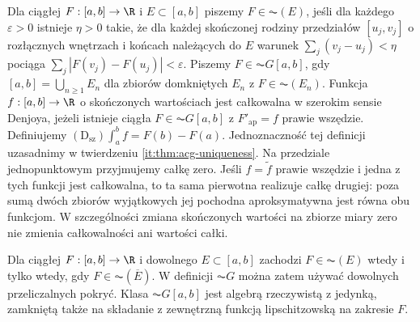 \begin{definicja}\label{it:def:denjoy-broad}
Dla ciągłej $F:[a,b]\to\R$ i $E\subset[a,b]$ piszemy $F\in\AC(E)$, jeśli dla każdego $\varepsilon>0$ istnieje $\eta>0$ takie, że dla każdej skończonej rodziny przedziałów $[u_j,v_j]$ o rozłącznych wnętrzach i końcach należących do $E$ warunek $\sum_j(v_j-u_j)<\eta$ pociąga $\sum_j|F(v_j)-F(u_j)|<\varepsilon$. Piszemy $F\in\AC G[a,b]$, gdy $[a,b]=\bigcup_{n\ge1}E_n$ dla zbiorów domkniętych $E_n$ z $F\in\AC(E_n)$. Funkcja $f:[a,b]\to\R$ o skończonych wartościach jest całkowalna w szerokim sensie Denjoya, jeżeli istnieje ciągła $F\in\AC G[a,b]$ z $F'_{\mathrm{ap}}=f$ prawie wszędzie. Definiujemy $(\mathrm D_{\mathrm{sz}})\int_a^b f=F(b)-F(a)$. Jednoznaczność tej definicji uzasadnimy w twierdzeniu \ref{it:thm:acg-uniqueness}. Na przedziale jednopunktowym przyjmujemy całkę zero.
Jeśli $f=\widetilde f$ prawie wszędzie i jedna z tych
funkcji jest całkowalna, to ta sama pierwotna realizuje
całkę drugiej: poza sumą dwóch zbiorów wyjątkowych jej
pochodna aproksymatywna jest równa obu funkcjom.
W szczególności zmiana skończonych wartości na zbiorze
miary zero nie zmienia całkowalności ani wartości całki.
\end{definicja}
\begin{twierdzenie}
\label{it:thm:acg-closure-algebra}\label{ma1:kh:thm:acg-algebra}
Dla ciągłej $F:[a,b]\to\R$ i dowolnego $E\subset[a,b]$
zachodzi $F\in\AC(E)$ wtedy i tylko wtedy, gdy $F\in\AC(\overline E)$.
W definicji $\AC G$ można zatem używać dowolnych przeliczalnych
pokryć. Klasa $\AC G[a,b]$ jest algebrą rzeczywistą z jedynką,
zamkniętą także na składanie z zewnętrzną funkcją lipschitzowską
na zakresie $F$.
\end{twierdzenie}
